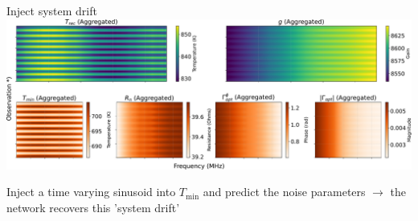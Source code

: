 \documentclass[aspectratio=169]{beamer}
\begin{document}
\begin{frame}{\small{Inject system drift}}
	\centering
	\includegraphics[width=\textwidth]{images/temps_combined_2d.pdf}
	\begin{tcolorbox}[colback=blue!5!white,colframe=blue!75!black,title=]
		Inject a time varying sinusoid into $T_{\text{min}}$ and predict the noise parameters $\rightarrow$ the network recovers this 'system drift'
	\end{tcolorbox}
\end{frame}




\end{document}
